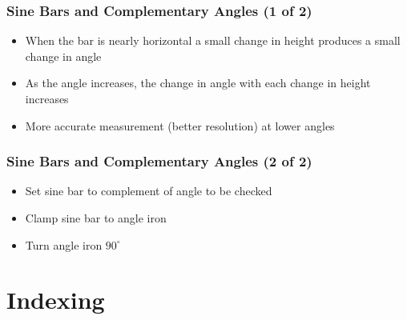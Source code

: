 
\begin{frame}
	\frametitle{Sine Bars and Complementary Angles (1 of 2)}

    \begin{itemize}[<+- | alert@+>]
        \item When the bar is nearly horizontal a small change in height produces a small change in angle
        \item As the angle increases, the change in angle with each change in height increases
        \item More accurate measurement (better resolution) at lower angles
    \end{itemize}
\end{frame}

\begin{frame}
	\frametitle{Sine Bars and Complementary Angles (2 of 2)}

    \begin{itemize}[<+- | alert@+>]
        \item Set sine bar to complement of angle to be checked
        \item Clamp sine bar to angle iron
        \item Turn angle iron $90^\circ$
    \end{itemize}
\end{frame}

\section{Indexing}

